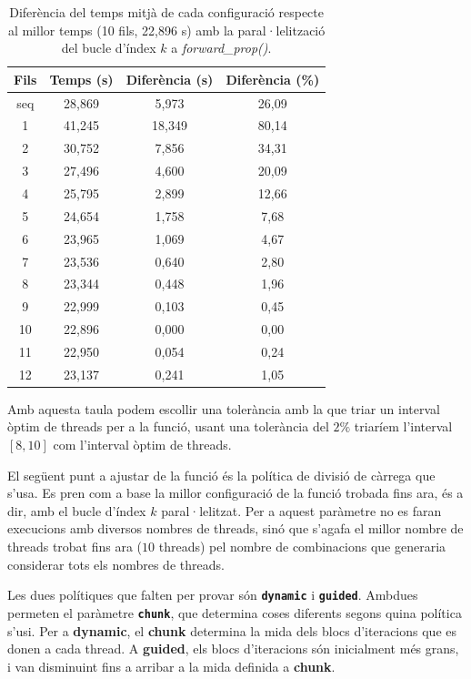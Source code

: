 \documentclass{article}
\begin{document}
\begin{table}[H]
\centering
\begin{tabular}{|c|c|c|c|}
\hline
\textbf{Fils} & \textbf{Temps (s)} & \textbf{Diferència (s)} & \textbf{Diferència (\%)} \\ \hline
seq & 28,869 & 5,973 & 26,09 \\ \hline
1 & 41,245 & 18,349 & 80,14 \\ \hline
2 & 30,752 & 7,856 & 34,31 \\ \hline
3 & 27,496 & 4,600 & 20,09 \\ \hline
4 & 25,795 & 2,899 & 12,66 \\ \hline
5 & 24,654 & 1,758 & 7,68 \\ \hline
6 & 23,965 & 1,069 & 4,67 \\ \hline
7 & 23,536 & 0,640 & 2,80 \\ \hline
8 & 23,344 & 0,448 & 1,96 \\ \hline
9 & 22,999 & 0,103 & 0,45 \\ \hline
10 & 22,896 & 0,000 & 0,00 \\ \hline
11 & 22,950 & 0,054 & 0,24 \\ \hline
12 & 23,137 & 0,241 & 1,05 \\ \hline
\end{tabular}
\caption{Diferència del temps mitjà de cada configuració respecte al millor temps (10 fils, 22,896 s) amb la paral·lelització del bucle d'índex $k$ a \textit{forward\_prop()}.}
\label{tab:dif_millor_k}
\end{table}

Amb aquesta taula podem escollir una tolerància amb la que triar un interval òptim de threads per a la funció, usant una tolerància del $2\%$ triaríem l'interval $[8, 10]$ com l'interval òptim de threads.



El següent punt a ajustar de la funció és la política de divisió de càrrega que s'usa. Es pren com a base la millor configuració de la funció trobada fins ara, és a dir, amb el bucle d'índex $k$ paral·lelitzat. Per a aquest paràmetre no es faran execucions amb diversos nombres de threads, sinó que s'agafa el millor nombre de threads trobat fins ara ($10$ threads) pel nombre de combinacions que generaria considerar tots els nombres de threads.

Les dues polítiques que falten per provar són \textbf{\texttt{dynamic}} i \textbf{\texttt{guided}}. Ambdues permeten el paràmetre \textbf{\texttt{chunk}}, que determina coses diferents segons quina política s'usi.
Per a \textbf{dynamic}, el \textbf{chunk} determina la mida dels blocs d'iteracions que es donen a cada thread. A \textbf{guided}, els blocs d'iteracions són inicialment més grans, i van disminuint fins a arribar a la mida definida a \textbf{chunk}.
\end{document}

